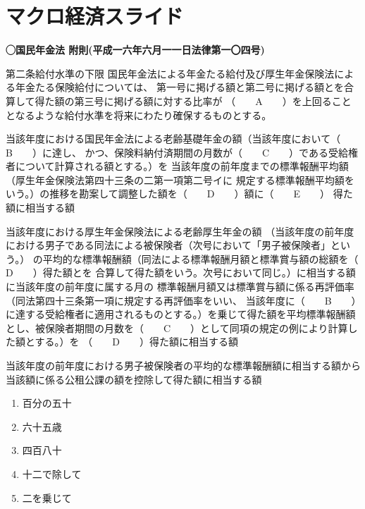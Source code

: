 \section{マクロ経済スライド}

\begin{fillblank}[年金1 2021 問題1(5)\textcircled{2}]
    \noindent \textbf{◯国民年金法 附則(平成一六年六月一一日法律第一〇四号)}
  \begin{lawstructure}
    \begin{lawarticle}{第二条}{給付水準の下限}
      国民年金法による年金たる給付及び厚生年金保険法による年金たる保険給付については、
      第一号に掲げる額と第二号に掲げる額とを合算して得た額の第三号に掲げる額に対する比率が
      （　　A　　）を上回ることとなるような給付水準を将来にわたり確保するものとする。

      当該年度における国民年金法による老齢基礎年金の額（当該年度において（　　B　　）に達し、
      かつ、保険料納付済期間の月数が（　　C　　）である受給権者について計算される額とする。）を
      当該年度の前年度までの標準報酬平均額（厚生年金保険法第四十三条の二第一項第二号イに
      規定する標準報酬平均額をいう。）の推移を勘案して調整した額を（　　D　　）額に（　　E　　）
      得た額に相当する額

      当該年度における厚生年金保険法による老齢厚生年金の額
      （当該年度の前年度における男子である同法による被保険者（次号において「男子被保険者」という。）
      の平均的な標準報酬額（同法による標準報酬月額と標準賞与額の総額を（　　D　　）得た額とを
      合算して得た額をいう。次号において同じ。）に相当する額に当該年度の前年度に属する月の
      標準報酬月額又は標準賞与額に係る再評価率（同法第四十三条第一項に規定する再評価率をいい、
      当該年度に（　　B　　）に達する受給権者に適用されるものとする。）を乗じて得た額を平均標準報酬額
      とし、被保険者期間の月数を（　　C　　）として同項の規定の例により計算した額とする。）を
      （　　D　　）得た額に相当する額

      当該年度の前年度における男子被保険者の平均的な標準報酬額に相当する額から当該額に係る公租公課の額を控除して得た額に相当する額
    
    \end{lawarticle}
  \end{lawstructure}
\end{fillblank}


\begin{answerbox}
  \begin{enumerate}[A: ]
    \item 百分の五十
    \item 六十五歳
    \item 四百八十
    \item 十二で除して
    \item 二を乗じて
  \end{enumerate}
\end{answerbox}

